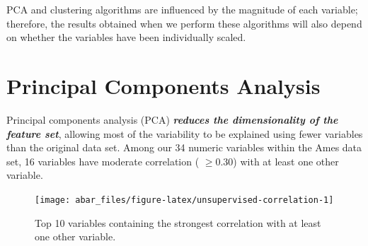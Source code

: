 \documentclass[]{book}
\newenvironment{Shaded}{\begin{snugshade}}{\end{snugshade}}
\newcommand{\CommentTok}[1]{\textcolor[rgb]{0.56,0.35,0.01}{\textit{#1}}}
\newcommand{\DecValTok}[1]{\textcolor[rgb]{0.00,0.00,0.81}{#1}}
\newcommand{\KeywordTok}[1]{\textcolor[rgb]{0.13,0.29,0.53}{\textbf{#1}}}
\newcommand{\NormalTok}[1]{#1}
\newcommand{\OperatorTok}[1]{\textcolor[rgb]{0.81,0.36,0.00}{\textbf{#1}}}
\newcommand{\StringTok}[1]{\textcolor[rgb]{0.31,0.60,0.02}{#1}}
\theoremstyle{definition}
\theoremstyle{definition}
\theoremstyle{definition}
\theoremstyle{remark}
\let\BeginKnitrBlock\begin \let\EndKnitrBlock\end
\begin{document}
\begin{Shaded}
\end{Shaded}

\BeginKnitrBlock{note}
PCA and clustering algorithms are influenced by the magnitude of each
variable; therefore, the results obtained when we perform these
algorithms will also depend on whether the variables have been
individually scaled.
\EndKnitrBlock{note}

\hypertarget{pca}{%
\section{Principal Components Analysis}\label{pca}}

Principal components analysis (PCA) \textbf{\emph{reduces the
dimensionality of the feature set}}, allowing most of the variability to
be explained using fewer variables than the original data set. Among our
34 numeric variables within the Ames data set, 16 variables have
moderate correlation ( \(\geq 0.30\)) with at least one other variable.

\begin{figure}

{\centering \texttt{[image: abar\_files/figure-latex/unsupervised-correlation-1]} 

}

\caption{Top 10 variables containing the strongest correlation with at least one other variable.}\label{fig:unsupervised-correlation}
\end{figure}
\end{document}
